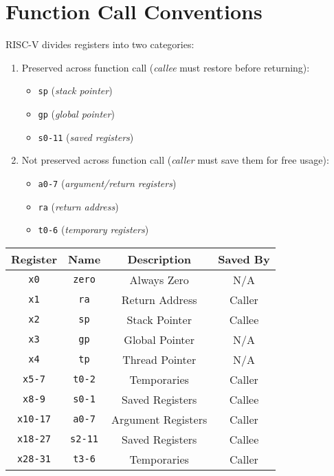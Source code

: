\section{Function Call Conventions}
RISC-V divides registers into two categories:
\begin{enumerate}
	\item Preserved across function call (\emph{callee} must restore before returning):
		\begin{itemize}
			\item \texttt{sp} (\emph{stack pointer})
			\item \texttt{gp} (\emph{global pointer})
			\item \texttt{s0-11} (\emph{saved registers})
		\end{itemize}
	\item Not preserved across function call (\emph{caller} must save them for free usage):
		\begin{itemize}
			\item \texttt{a0-7} (\emph{argument/return registers})
			\item \texttt{ra} (\emph{return address})
			\item \texttt{t0-6} (\emph{temporary registers})
		\end{itemize}
\end{enumerate}

\begin{tabular}{ |c|c|c|c| } 
 \hline
 \textbf{Register} & \textbf{Name} & \textbf{Description} & \textbf{Saved By} \\ 
 \hline
 \texttt{x0} & \texttt{zero} & Always Zero & N/A \\
 \texttt{x1} & \texttt{ra} & Return Address & Caller \\
 \texttt{x2} & \texttt{sp} & Stack Pointer & Callee \\
 \texttt{x3} & \texttt{gp} & Global Pointer & N/A \\
 \texttt{x4} & \texttt{tp} & Thread Pointer & N/A \\
 \texttt{x5-7} & \texttt{t0-2} & Temporaries & Caller \\
 \texttt{x8-9} & \texttt{s0-1} & Saved Registers & Callee \\
 \texttt{x10-17} & \texttt{a0-7} & Argument Registers & Caller \\
 \texttt{x18-27} & \texttt{s2-11} & Saved Registers & Callee \\
 \texttt{x28-31} & \texttt{t3-6} & Temporaries & Caller \\
 \hline
\end{tabular}

